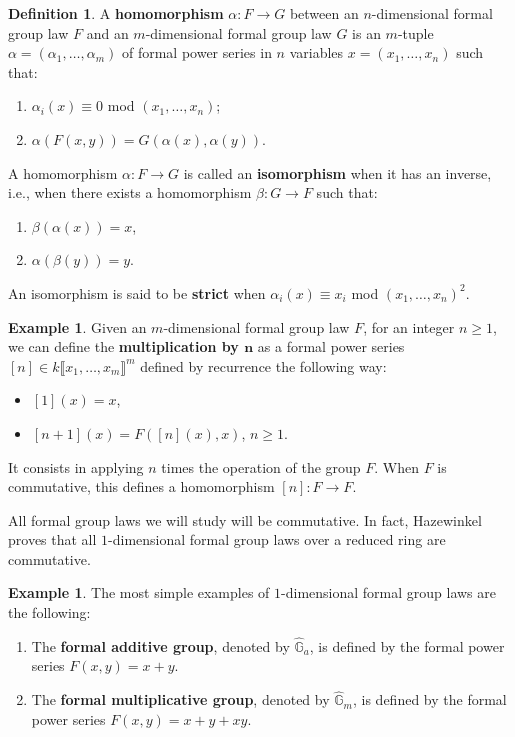 \documentclass{report}
\theoremstyle{definition}
\newtheorem{definition}[theorem]{Definition}
\newtheorem{example}[theorem]{Example}
\begin{document}
\begin{definition}
A \textbf{homomorphism} $\alpha:F\rightarrow G$ between an $n$-dimensional formal group law $F$ and an $m$-dimensional formal group law $G$ is an $m$-tuple $\alpha=(\alpha_1,\ldots,\alpha_m)$ of formal power series in $n$ variables $x=(x_1,\ldots,x_n)$ such that:
\begin{enumerate}
\item $\alpha_i(x)\equiv0$ mod $(x_1,\ldots,x_n)$;
\item $\alpha(F(x,y))=G(\alpha(x),\alpha(y))$.
\end{enumerate}

A homomorphism $\alpha:F\rightarrow G$ is called an \textbf{isomorphism} when it has an inverse, i.e., when there exists a homomorphism $\beta:G\rightarrow F$ such that:
\begin{enumerate}
\item $\beta(\alpha(x))=x$,
\item $\alpha(\beta(y))=y$.
\end{enumerate}

An isomorphism is said to be \textbf{strict} when $\alpha_i(x)\equiv x_i$ mod $(x_1,\ldots,x_n)^2$.
\end{definition}

\begin{example}
Given an $m$-dimensional formal group law $F$, for an integer $n\geq1$, we can define the \textbf{multiplication by $\boldsymbol{n}$} as a formal power series $[n]\in k\llbracket x_1,\ldots,x_m\rrbracket^m$ defined by recurrence the following way:
\begin{itemize}
\item $[1](x)=x$,
\item $[n+1](x)=F([n](x),x)$, $n\geq1$.
\end{itemize}

It consists in applying $n$ times the operation of the group $F$. When $F$ is commutative, this defines a homomorphism $[n]:F\rightarrow F$.
%
\end{example}

All formal group laws we will study will be commutative. In fact, Hazewinkel \cite[Section~I.6.1]{hazewinkel1978formal} proves that all $1$-dimensional formal group laws over a reduced ring are commutative.

\begin{example}
\label{exa:formal-additive-multiplicative}
The most simple examples of $1$-dimensional formal group laws are the following:
\begin{enumerate}
\item The \textbf{formal additive group}, denoted by $\widehat{\mathbb{G}}_a$, is defined by the formal power series $F(x,y)=x+y$.

\item The \textbf{formal multiplicative group}, denoted by $\widehat{\mathbb{G}}_m$, is defined by the formal power series $F(x,y)=x+y+xy$.
\end{enumerate}
\end{example}
\end{document}
